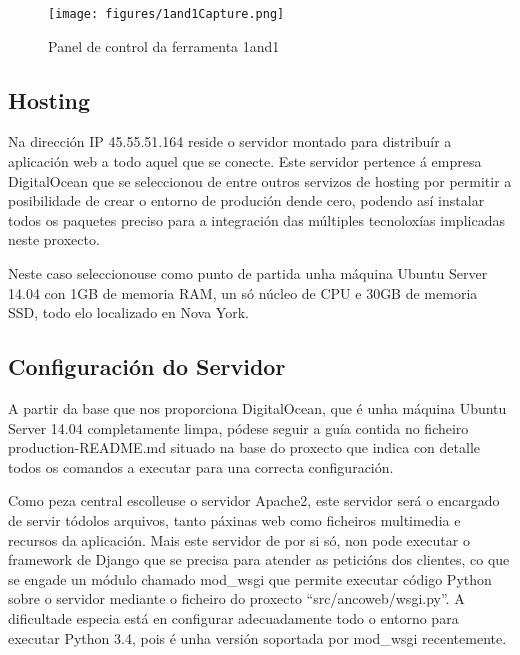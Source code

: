         \begin{figure}[htp]
        \begin{center}
            \texttt{[image: figures/1and1Capture.png]}
            \caption{Panel de control da ferramenta 1and1}
        \label{fig:1and1Capture}
        \end{center}
        \end{figure}
    
    \subsection{Hosting}
        Na dirección IP 45.55.51.164 reside o servidor montado para distribuír a aplicación web a 
        todo aquel que se conecte. Este servidor pertence á empresa DigitalOcean
        \cite{digitalocean-website} que se seleccionou de entre outros servizos de hosting por 
        permitir a posibilidade de crear o entorno de produción dende cero, podendo así instalar 
        todos os paquetes preciso para a integración das múltiples tecnoloxías implicadas neste 
        proxecto.
        
        Neste caso seleccionouse como punto de partida unha máquina Ubuntu Server 14.04 con 1GB de 
        memoria RAM, un só núcleo de CPU e 30GB de memoria SSD, todo elo localizado en Nova York.
    
    \subsection{Configuración do Servidor}
        A partir da base que nos proporciona DigitalOcean, que é unha máquina Ubuntu Server 14.04 
        completamente limpa, pódese seguir a guía contida no ficheiro production-README.md situado
        na base do proxecto que indica con detalle todos os comandos a executar para una correcta 
        configuración. 
        
        Como peza central escolleuse o servidor Apache2, este servidor será o encargado de servir 
        tódolos arquivos, tanto páxinas web como ficheiros multimedia e recursos da aplicación. Mais
        este servidor de por si só, non pode executar o framework de Django que se precisa para 
        atender as peticións dos clientes, co que se engade un módulo chamado mod\_wsgi
        que permite executar código Python sobre o servidor mediante o ficheiro do proxecto
        ``src/ancoweb/wsgi.py''. A dificultade especia está en configurar adecuadamente todo o entorno
        para executar Python 3.4, pois é unha versión soportada por mod\_wsgi recentemente.
        
